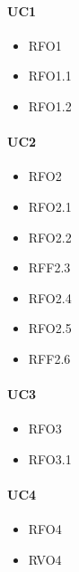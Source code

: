 \paragraph{UC1}
\quad
\begin{multicols}{3}
    \begin{itemize}
        \item RFO1
        \item RFO1.1
        \item RFO1.2
    \end{itemize}
\end{multicols}

\paragraph{UC2}
\quad
\begin{multicols}{3}
    \begin{itemize}
        \item RFO2
        \item RFO2.1
        \item RFO2.2
        \item RFF2.3
        \item RFO2.4
        \item RFO2.5
        \item RFF2.6
    \end{itemize}
\end{multicols}

\paragraph{UC3}
\quad
\begin{multicols}{3}
    \begin{itemize}
        \item RFO3
        \item RFO3.1
    \end{itemize}
\end{multicols}

\paragraph{UC4}
\quad
\begin{multicols}{3}
    \begin{itemize}
        \item RFO4
        \item RVO4
    \end{itemize}
\end{multicols}


